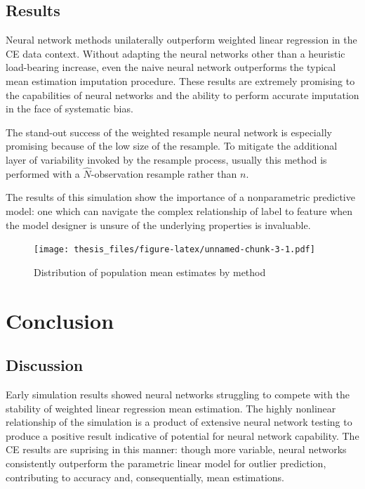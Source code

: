 \documentclass[12pt,twoside]{reedthesis}
\begin{document}
\section{Results}\label{results}

Neural network methods unilaterally outperform weighted linear
regression in the CE data context. Without adapting the neural networks
other than a heuristic load-bearing increase, even the naive neural
network outperforms the typical mean estimation imputation procedure.
These results are extremely promising to the capabilities of neural
networks and the ability to perform accurate imputation in the face of
systematic bias.

The stand-out success of the weighted resample neural network is
especially promising because of the low size of the resample. To
mitigate the additional layer of variability invoked by the resample
process, usually this method is performed with a \(\hat{N}\)-observation
resample rather than \(n\).

The results of this simulation show the importance of a nonparametric
predictive model: one which can navigate the complex relationship of
label to feature when the model designer is unsure of the underlying
properties is invaluable.
\begin{figure}
\centering
\texttt{[image: thesis\_files/figure-latex/unnamed-chunk-3-1.pdf]}
\caption{\label{fig:unnamed-chunk-3}Distribution of population mean
estimates by method}
\end{figure}
\chapter{Conclusion}\label{conclusion}

\section{Discussion}\label{discussion}

Early simulation results showed neural networks struggling to compete
with the stability of weighted linear regression mean estimation. The
highly nonlinear relationship of the simulation is a product of
extensive neural network testing to produce a positive result indicative
of potential for neural network capability. The CE results are suprising
in this manner: though more variable, neural networks consistently
outperform the parametric linear model for outlier prediction,
contributing to accuracy and, consequentially, mean estimations.
\end{document}
